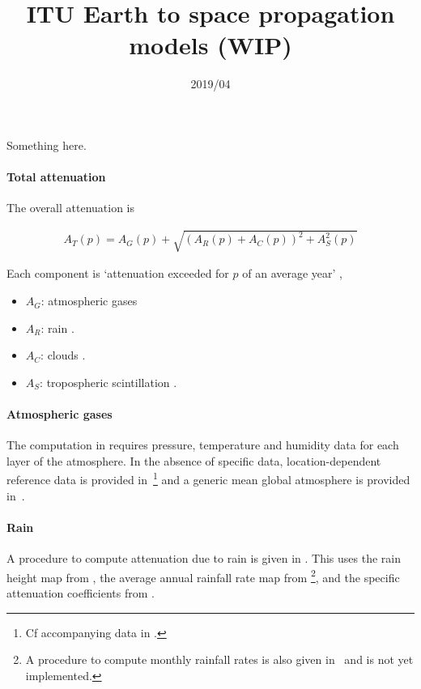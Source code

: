 \documentclass[10pt,notitlepage,oneside]{article}
\begin{document}
\title{ITU Earth to space propagation models (WIP)}
\date{2019/04 \textendash{}}
\maketitle

Something here.

\paragraph{Total attenuation}

The overall attenuation is \cite[(60)]{ITU-P.618-13}

\begin{align}
  A_T(p) = A_G(p) + \sqrt{(A_R(p) + A_C(p))^2 + A_S^2(p)}
\end{align}

Each component is ‘attenuation exceeded for $p$ of an average year’ \cite[\S2.2.2.1 Step 9]{ITU-P.618-13},

\begin{itemize}
\item $A_G$: atmospheric gases \cite[(20)]{ITU-P.676-11}
\item $A_R$: rain \cite[(8)]{ITU-P.618-13}.
\item $A_C$: clouds \cite{ITU-P.840-7}.
\item $A_S$: tropospheric scintillation \cite[(46)]{ITU-P.618-13}.
\end{itemize}

\paragraph{Atmospheric gases}

The computation in \cite[(20)]{ITU-P.676-11} requires pressure, temperature and humidity data for each layer of the atmosphere. In the absence of specific data, location-dependent reference data is provided in~\cite[Annex~2]{ITU-P.835-6}\footnote{Cf accompanying data in \cite{ITU-prop-soft}.} and a generic mean global atmosphere is provided in~\cite[Annex~1]{ITU-P.835-6}.

\paragraph{Rain} A procedure to compute attenuation due to rain is given in \cite[\S2.2.1.1]{ITU-P.618-13}. This uses the rain height map from \cite[\S2.2.1.1]{ITU-P.839-4}, the average annual rainfall rate map from \cite{ITU-P.837-7}\footnote{A procedure to compute monthly rainfall rates is also given in~\cite{ITU-P.837-7} and is not yet implemented.\todo{}}, and the specific attenuation coefficients from \cite{ITU-P.838-3}.

\cite{ITU-P.676-11}

\cite{ITU-e2s-val}

\small



\tableofcontents
\printindex

\todos
\end{document}
